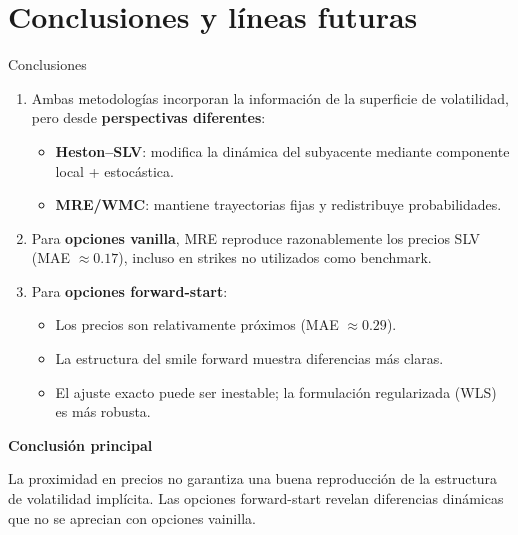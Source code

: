 \documentclass[8pt]{beamer}
\begin{document}
\section{Conclusiones y líneas futuras}

\begin{frame}{Conclusiones}
    \begin{enumerate}
        \item Ambas metodologías incorporan la información de la superficie de volatilidad, pero desde \textbf{perspectivas diferentes}:
        \begin{itemize}
            \item \textbf{Heston--SLV}: modifica la dinámica del subyacente mediante componente local + estocástica.
            \item \textbf{MRE/WMC}: mantiene trayectorias fijas y redistribuye probabilidades.
        \end{itemize}
        \pause
        
        \item Para \textbf{opciones vanilla}, MRE reproduce razonablemente los precios SLV (MAE $\approx 0.17$), incluso en strikes no utilizados como benchmark.
        \pause
        
        \item Para \textbf{opciones forward-start}:
        \begin{itemize}
            \item Los precios son relativamente próximos (MAE $\approx 0.29$).
            \item La estructura del smile forward muestra diferencias más claras.
            \item El ajuste exacto puede ser inestable; la formulación regularizada (WLS) es más robusta.
        \end{itemize}
    \end{enumerate}
    \pause

    \textbf{Conclusión principal}

La proximidad en precios no garantiza una buena reproducción de la estructura de volatilidad implícita. Las opciones forward-start revelan diferencias dinámicas que no se aprecian con opciones vainilla.

\end{frame}
\end{document}
